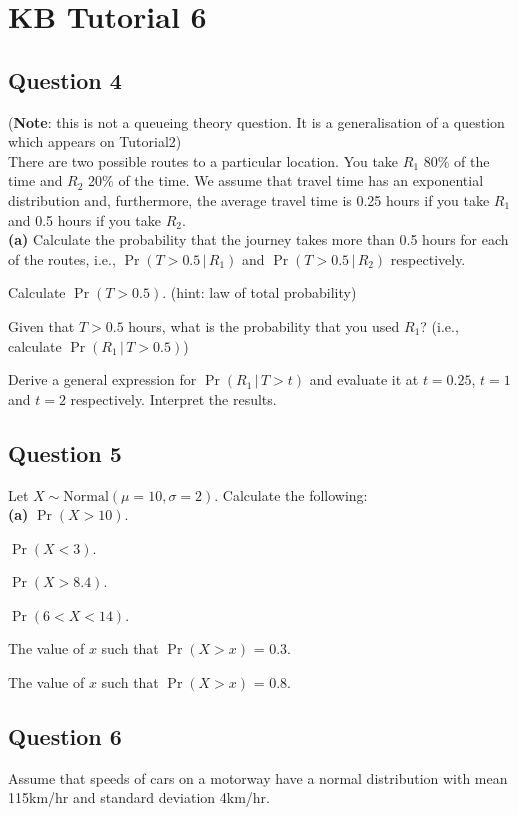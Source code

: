 
\newpage
\section{KB Tutorial 6}






\subsection*{Question 4}
{\footnotesize({\bf Note}: this is not a queueing theory question. It is a generalisation of a question which appears on Tutorial2)}\\[0.1cm]
There are two possible routes to a particular location. You take $R_1$ 80\% of the time and $R_2$ 20\% of the time. We assume that travel time has an exponential distribution and, furthermore, the average travel time is 0.25 hours if you take $R_1$ and 0.5 hours if you take $R_2$.\\[-0.2cm]

{\bf(a)} Calculate the probability that the journey takes more than 0.5 hours for each of the routes, i.e., $\Pr(T > 0.5\,|\,R_1)$ and $\Pr(T > 0.5\,|\,R_2)$ respectively. 
 \item  Calculate $\Pr(T > 0.5)$. (hint: law of total probability) 
 \item  Given that $T>0.5$ hours, what is the probability that you used $R_1$? (i.e., calculate $\Pr(R_1\,|\,T>0.5)$) 
 \item  Derive a general expression for $\Pr(R_1\,|\,T>t)$ and evaluate it at $t=0.25$, $t = 1$ and $t = 2$ respectively. Interpret the results.




\subsection*{Question 5}
Let $X \sim \text{Normal}(\mu=10,\sigma=2)$. Calculate the following:\\[-0.2cm]

{\bf(a)} $\Pr(X>10)$. 
 \item  $\Pr(X<3)$. 
 \item  $\Pr(X>8.4)$. 
 \item  $\Pr(6<X<14)$. 
 \item  The value of $x$ such that $\Pr(X>x)$ = 0.3. 
 \item  The value of $x$ such that $\Pr(X>x)$ = 0.8.



\subsection*{Question 6}
Assume that speeds of cars on a motorway have a normal distribution with mean 115km/hr and standard deviation 4km/hr.\\[-0.2cm]

